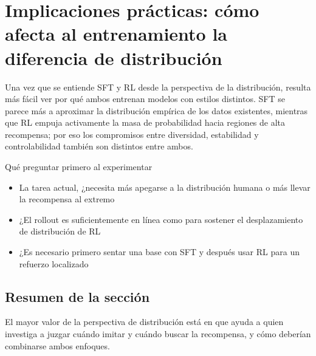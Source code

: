 \section{Implicaciones prácticas: cómo afecta al entrenamiento la diferencia de distribución}
Una vez que se entiende SFT y RL desde la perspectiva de la distribución, resulta más fácil ver por qué ambos entrenan modelos con estilos distintos. SFT se parece más a aproximar la distribución empírica de los datos existentes, mientras que RL empuja activamente la masa de probabilidad hacia regiones de alta recompensa; por eso los compromisos entre diversidad, estabilidad y controlabilidad también son distintos entre ambos.

\begin{knowledgebox}{Qué preguntar primero al experimentar}
\begin{itemize}
  \item La tarea actual, ¿necesita más apegarse a la distribución humana o más llevar la recompensa al extremo
  \item ¿El rollout es suficientemente en línea como para sostener el desplazamiento de distribución de RL
  \item ¿Es necesario primero sentar una base con SFT y después usar RL para un refuerzo localizado
\end{itemize}
\end{knowledgebox}

\subsection{Resumen de la sección}
El mayor valor de la perspectiva de distribución está en que ayuda a quien investiga a juzgar cuándo imitar y cuándo buscar la recompensa, y cómo deberían combinarse ambos enfoques.

\newpage
